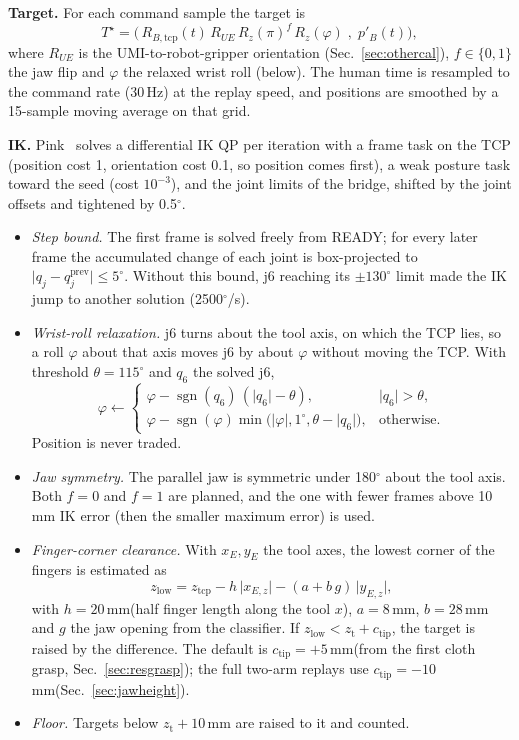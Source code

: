 \documentclass[conference,10pt]{IEEEtran}
\newcommand{\mm}{\,mm\xspace}
\DeclareMathOperator{\sgn}{sgn}
\begin{document}
\textbf{Target.} For each command sample the target is
\begin{equation}
T^\star=\Big(\,R_{B,\mathrm{tcp}}(t)\,R_{UE}\,R_z(\pi)^{f}\,R_z(\varphi)\;,\;p'_B(t)\Big),
\end{equation}
where $R_{UE}$ is the UMI-to-robot-gripper orientation (Sec.~\ref{sec:othercal}), $f\in\{0,1\}$ the jaw flip and $\varphi$
the relaxed wrist roll (below). The human time is resampled to the command rate (30\,Hz) at the replay speed, and
positions are smoothed by a 15-sample moving average on that grid.

\textbf{IK.} Pink~\cite{pink} solves a differential IK QP per iteration with a frame task on the TCP (position cost 1,
orientation cost 0.1, so position comes first), a weak posture task toward the seed (cost $10^{-3}$), and the joint limits
of the bridge, shifted by the joint offsets and tightened by 0.5$^\circ$.
\begin{itemize}
\item \emph{Step bound.} The first frame is solved freely from READY; for every later frame the accumulated change of each
  joint is box-projected to $\lvert q_j-q_j^{\mathrm{prev}}\rvert\le5^\circ$. Without this bound, j6 reaching its
  $\pm130^\circ$ limit made the IK jump to another solution (2500$^\circ$/s).
\item \emph{Wrist-roll relaxation.} j6 turns about the tool axis, on which the TCP lies, so a roll $\varphi$ about that axis
  moves j6 by about $\varphi$ without moving the TCP. With threshold $\theta=115^\circ$ and $q_6$ the solved j6,
  \begin{equation}
  \varphi\leftarrow\begin{cases}\varphi-\sgn(q_6)\,(\lvert q_6\rvert-\theta), & \lvert q_6\rvert>\theta,\\
  \varphi-\sgn(\varphi)\min\big(\lvert\varphi\rvert,1^\circ,\theta-\lvert q_6\rvert\big), & \text{otherwise.}\end{cases}
  \end{equation}
  Position is never traded.
\item \emph{Jaw symmetry.} The parallel jaw is symmetric under 180$^\circ$ about the tool axis. Both $f=0$ and $f=1$ are
  planned, and the one with fewer frames above 10\mm IK error (then the smaller maximum error) is used.
\item \emph{Finger-corner clearance.} With $x_E,y_E$ the tool axes, the lowest corner of the fingers is estimated as
  \begin{equation}
  z_\mathrm{low}=z_\mathrm{tcp}-h\,\lvert x_{E,z}\rvert-(a+b\,g)\,\lvert y_{E,z}\rvert,
  \end{equation}
  with $h=20$\mm (half finger length along the tool $x$), $a=8$\mm, $b=28$\mm and $g$ the jaw opening from the classifier.
  If $z_\mathrm{low}<z_\mathrm{t}+c_\mathrm{tip}$, the target is raised by the difference. The default is
  $c_\mathrm{tip}=+5$\mm (from the first cloth grasp, Sec.~\ref{sec:resgrasp}); the full two-arm replays use
  $c_\mathrm{tip}=-10$\mm (Sec.~\ref{sec:jawheight}).
\item \emph{Floor.} Targets below $z_\mathrm{t}+10$\mm are raised to it and counted.
\end{itemize}
\end{document}
